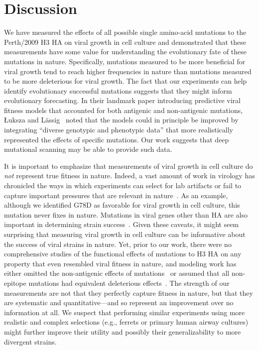 \documentclass[9pt,twocolumn,twoside]{pnas-new}
\begin{document}
\section*{Discussion}
\label{sec:discussion}
We have measured the effects of all possible single amino-acid mutations to the Perth/2009 H3 HA on viral growth in cell culture and demonstrated that these measurements have some value for understanding the evolutionary fate of these mutations in nature.
Specifically, mutations measured to be more beneficial for viral growth tend to reach higher frequencies in nature than mutations measured to be more deleterious for viral growth.
The fact that our experiments can help identify evolutionary successful mutations suggests that they might inform evolutionary forecasting.
In their landmark paper introducing predictive viral fitness models that accounted for both antigenic and non-antigenic mutations, {\L}uksza and L{\"a}ssig~\cite{luksza2014predictive} noted that the models could in principle be improved by integrating ``diverse genotypic and phenotypic data'' that more realistically represented the effects of specific mutations.
Our work suggests that deep mutational scanning may be able to provide such data.

It is important to emphasize that measurements of viral growth in cell culture do \emph{not} represent true fitness in nature.
Indeed, a vast amount of work in virology has chronicled the ways in which experiments can select for lab artifacts or fail to capture important pressures that are relevant in nature~\cite{daniels1985fusion,sun2010modifications,lee2013comparison,wu2017structural}.
As an example, although we identified G78D as favorable for viral growth in cell culture, this mutation never fixes in nature.
Mutations in viral genes other than HA are also important in determining strain success~\cite{memoli2009recent,raghwani2017selection}.
Given these caveats, it might seem surprising that measuring viral growth in cell culture can be informative about the success of viral strains in nature.
Yet, prior to our work, there were no comprehensive studies of the functional effects of mutations to H3 HA on any property that even resembled viral fitness in nature, and modeling work has either omitted the non-antigenic effects of mutations~\cite{sun2013using,harvey2016identification,neher2016prediction} or assumed that all non-epitope mutations had equivalent deleterious effects~\cite{luksza2014predictive}.
The strength of our measurements are not that they perfectly capture fitness in nature, but that they are systematic and quantitative---and so represent an improvement over no information at all.
We suspect that performing similar experiments using more realistic and complex selections (e.g., ferrets or primary human airway cultures) might further improve their utility and possibly their generalizability to more divergent strains.
\end{document}
